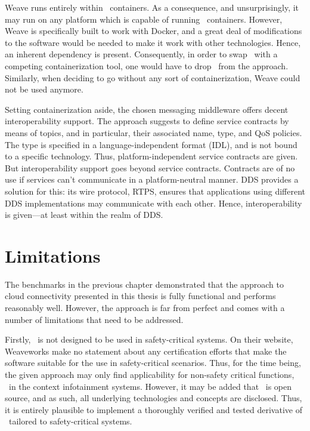 Weave runs entirely within \docker\ containers. As a consequence, and unsurprisingly, it may run on any platform which is capable of running \docker\ containers. However, Weave is specifically built to work with Docker, and a great deal of modifications to the software would be needed to make it work with other technologies. Hence, an inherent dependency is present. Consequently, in order to swap \docker\ with a competing containerization tool, one would have to drop \wnet\ from the approach. Similarly, when deciding to go without any sort of containerization, Weave could not be used anymore.

Setting containerization aside, the chosen messaging middleware offers decent interoperability support. The approach suggests to define service contracts by means of topics, and in particular, their associated name, type, and QoS policies. The type is specified in a language-independent format (IDL), and is not bound to a specific technology. Thus, platform-independent service contracts are given. But interoperability support goes beyond service contracts. Contracts are of no use if services can't communicate in a platform-neutral manner. DDS provides a solution for this: its wire protocol, RTPS, ensures that applications using different DDS implementations may communicate with each other. Hence, interoperability is given---at least within the realm of DDS. 



\section{Limitations}

The benchmarks in the previous chapter demonstrated that the approach to cloud connectivity presented in this thesis is fully functional and performs reasonably well. However, the approach is far from perfect and comes with a number of limitations that need to be addressed.

Firstly, \wnet\ is not designed to be used in safety-critical systems. On their website, Weaveworks make no statement about any certification efforts that make the software suitable for the use in safety-critical scenarios. Thus, for the time being, the given approach may only find applicability for non-safety critical functions, \eg\ in the context infotainment systems. However, it may be added that \wnet\ is open source, and as such, all underlying technologies and concepts are disclosed. Thus, it is entirely plausible to implement a thoroughly verified and tested derivative of \wnet\ tailored to safety-critical systems.

